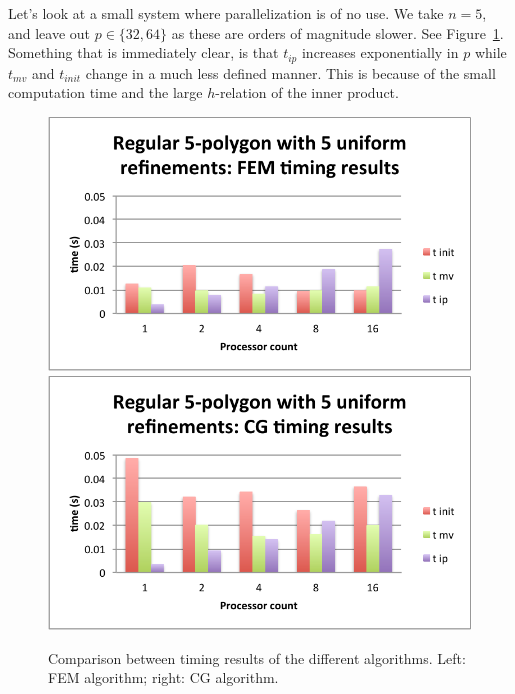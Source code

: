 \documentclass[11pt]{amsart}
\theoremstyle{definition}
\begin{document}
Let's look at a small system where parallelization is of no use. We take $n=5$, and leave out $p \in \{32,64\}$ as these are orders of magnitude slower. See Figure~\ref{fig:barchart_oud}. Something that is immediately clear, is that $t_{ip}$ increases exponentially in $p$ while $t_{mv}$ and $t_{init}$ change in a much less defined manner. This is because of the small computation time and the large $h$-relation of the inner product.
\begin{figure}
  \includegraphics[width=0.48\linewidth]{barchart_oud_fem.pdf}
  \includegraphics[width=0.48\linewidth]{barchart_oud_cg.pdf}
  \caption{Comparison between timing results of the different algorithms. Left: FEM algorithm; right: CG algorithm.}
  \label{fig:barchart_oud}
\end{figure}
\end{document}
